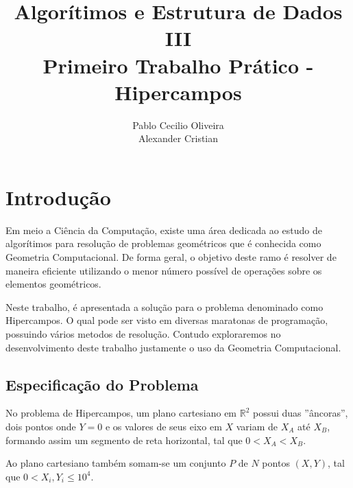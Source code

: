 \documentclass[12pt,a4paper]{article}
\author{Pablo Cecilio Oliveira\\
	Alexander Cristian}
\title{Algorítimos e Estrutura de Dados III\\
	Primeiro Trabalho Prático - Hipercampos}
\date{}
\begin{document}
\maketitle

\section{Introdução}

Em meio a Ciência da Computação, existe uma área dedicada ao estudo de algorítimos para resolução de problemas geométricos que é conhecida como Geometria Computacional. De forma geral, o objetivo deste ramo é resolver de maneira eficiente utilizando o menor número possível de operações sobre os elementos geométricos.

Neste trabalho, é apresentada a solução para o problema denominado como Hipercampos. O qual pode ser visto em diversas maratonas de programação, possuindo vários metodos de resolução. Contudo exploraremos no desenvolvimento deste trabalho justamente o uso da Geometria Computacional.

\subsection{Especificação do Problema}

No problema de Hipercampos, um plano cartesiano em $\mathbb{R}^2$ possui duas ''âncoras'', dois pontos onde $Y=0$ e os valores de seus eixo em $X$ variam de $X_A$ até $X_B$, formando assim um segmento de reta horizontal, tal que $0 < X_A < X_B$.

Ao plano cartesiano também somam-se um conjunto $P$ de $N$ pontos $(X,Y)$, tal que $0 < X_i,Y_i \leqslant 10^4$.
\end{document}
